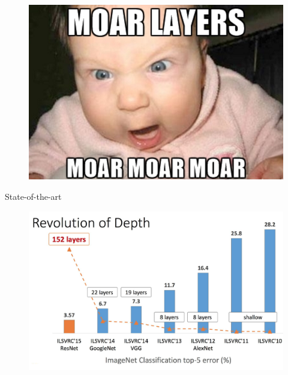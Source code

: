 \documentclass{beamer}
\begin{document}
\begin{frame}

\begin{figure}[h!]
  \centering
  \includegraphics[width=1\textwidth]{images/moar.png}
\end{figure}

\end{frame}


\begin{frame}{State-of-the-art}

\begin{figure}[h!]
  \centering
  \includegraphics[width=1\textwidth]{images/rev_depth.png}
\end{figure}

\end{frame}
\end{document}
